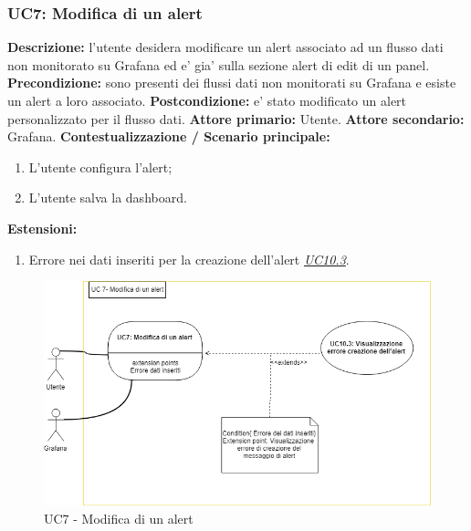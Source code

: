                 \subsubsection{UC7: Modifica di un alert}
                    \textbf{Descrizione:} l’utente desidera modificare un alert associato ad un flusso dati non monitorato su Grafana ed e’ gia’ sulla sezione alert di edit di un panel.
                    \newline
                    \textbf{Precondizione:} sono presenti dei flussi dati non monitorati su Grafana e esiste un alert a loro associato.
                    \newline
                    \textbf{Postcondizione:} e’ stato modificato un alert personalizzato per il flusso dati.
                    \newline
                    \textbf{Attore primario:} Utente.
                    \newline
                    \textbf{Attore secondario:} Grafana.
                    \newline
                    \textbf{Contestualizzazione / Scenario principale:} \begin{enumerate}
                            \item L’utente configura l’alert;
                            \item L’utente salva la dashboard.
                        \end{enumerate}
                    
                    \textbf{Estensioni:} 
                    \begin{enumerate}
                            \item Errore nei dati inseriti per la creazione dell'alert \underline{\textit{UC10.3}}.
                        \end{enumerate}
                        
                		\begin{figure}[!htbp]
		                	\centering
		                	\includegraphics[width=\textwidth]{UC7.png}
		                	\caption{UC7 - Modifica di un alert}
		                \end{figure}
	                \clearpage
                        
